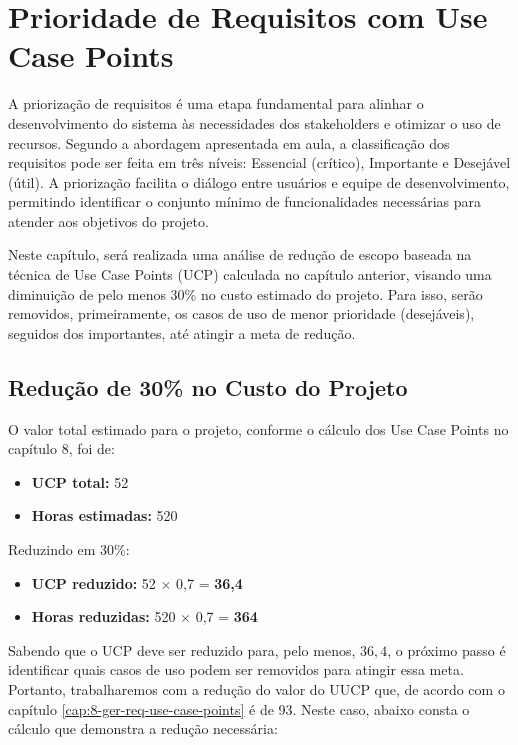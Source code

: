 \chapter{Prioridade de Requisitos com Use Case Points}\label{cap:9-prio-req}

A priorização de requisitos é uma etapa fundamental para alinhar o desenvolvimento do sistema às necessidades dos stakeholders e otimizar o uso de recursos. Segundo a abordagem apresentada em aula, a classificação dos requisitos pode ser feita em três níveis: Essencial (crítico), Importante e Desejável (útil). A priorização facilita o diálogo entre usuários e equipe de desenvolvimento, permitindo identificar o conjunto mínimo de funcionalidades necessárias para atender aos objetivos do projeto.

Neste capítulo, será realizada uma análise de redução de escopo baseada na técnica de Use Case Points (UCP) calculada no capítulo anterior, visando uma diminuição de pelo menos 30\% no custo estimado do projeto. Para isso, serão removidos, primeiramente, os casos de uso de menor prioridade (desejáveis), seguidos dos importantes, até atingir a meta de redução.

\section{Redução de 30\% no Custo do Projeto}

O valor total estimado para o projeto, conforme o cálculo dos Use Case Points no capítulo 8, foi de:

\begin{itemize}
    \item \textbf{UCP total:} 52
    \item \textbf{Horas estimadas:} 520
\end{itemize}

Reduzindo em 30\%:

\begin{itemize}
    \item \textbf{UCP reduzido:} 52 $\times$ 0,7 = \textbf{36,4}
    \item \textbf{Horas reduzidas:} 520 $\times$ 0,7 = \textbf{364}
\end{itemize}

Sabendo que o UCP deve ser reduzido para, pelo menos, $36,4$, o próximo passo é identificar quais casos de uso podem ser removidos para atingir essa meta. Portanto, trabalharemos com a redução do valor do UUCP que, de acordo com o capítulo \ref{cap:8-ger-req-use-case-points} é de 93. Neste caso, abaixo consta o cálculo que demonstra a redução necessária:


